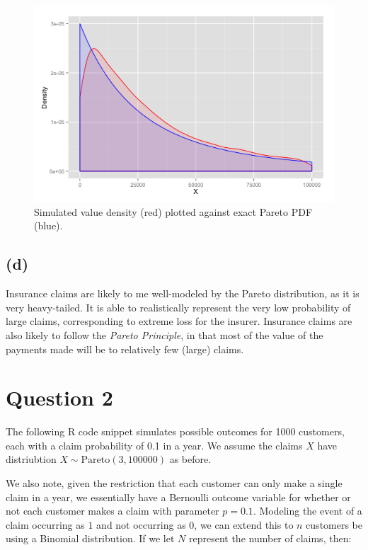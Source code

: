 \documentclass{article}
\begin{document}
\begin{figure}
  \includegraphics[width=\textwidth]{q1c_histogram}
  \caption{Simulated value density (red) plotted against exact Pareto
    PDF (blue).}
  \centering
  \label{fig:q1c_histogram}
\end{figure}

\subsection*{(d)}

Insurance claims are likely to me well-modeled by the Pareto
distribution, as it is very heavy-tailed. It is able to realistically
represent the very low probability of large claims, corresponding to
extreme loss for the insurer. Insurance claims are also likely to
follow the \emph{Pareto Principle}, in that most of the value of the
payments made will be to relatively few (large) claims.

\section*{Question 2}

The following R code snippet simulates possible outcomes for 1000
customers, each with a claim probability of 0.1 in a year. We assume
the claims $X$ have distriubtion $X \sim \mathrm{Pareto}(3, 100000)$
as before.

We also note, given the restriction that each customer can only make a
single claim in a year, we essentially have a Bernoulli outcome variable
for whether or not each customer makes a claim with parameter $p =
0.1$. Modeling the event of a claim occurring as $1$ and not occurring
as $0$, we can extend this to $n$ customers be using a Binomial
distribution. If we let $N$ represent the number of claims, then:
\end{document}
